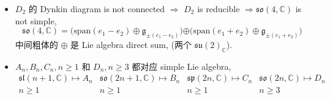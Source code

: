 \begin{itemize}
\begin{itemize}
		\item $D_2$ 的 Dynkin diagram is not connected $\Longrightarrow$ $D_2$ is reducible $\Longrightarrow \mathfrak{so}(4, \mathbb{C})$ is not simple,
		\begin{equation}
			\mathfrak{so}(4, \mathbb{C}) = \Big( \mathrm{span}(e_1 - e_2) \oplus \mathfrak{g}_{\pm (e_1 - e_2)} \Big) \boldsymbol{\oplus} \Big( \mathrm{span}(e_1 + e_2) \oplus \mathfrak{g}_{\pm (e_1 + e_2)} \Big)
		\end{equation}
		中间粗体的 $\oplus$ 是 Lie algebra direct sum, (两个 $\mathfrak{su}(2)_\mathbb{C}$).
		
		\item $A_n, B_n, C_n, n \geq 1$ 和 $D_n, n \geq 3$ 都对应 simple Lie algebra,
		\begin{equation}
			\begin{array}{cccc}
				\mathfrak{sl}(n + 1, \mathbb{C}) \mapsto A_n & \mathfrak{so}(2 n + 1, \mathbb{C}) \mapsto B_n & \mathfrak{sp}(2 n, \mathbb{C}) \mapsto C_n & \mathfrak{so}(2 n, \mathbb{C}) \mapsto D_n \\
				n \geq 1 & n \geq 1 & n \geq 1 & n \geq 3
			\end{array}
		\end{equation}
	\end{itemize}
\end{itemize}

